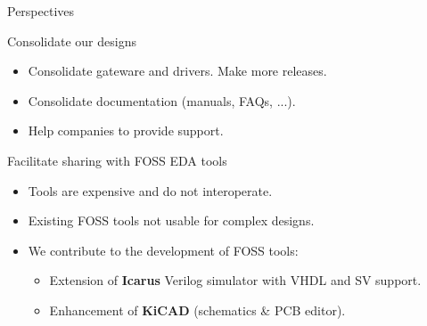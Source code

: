 \documentclass[compress,red]{beamer}
\begin{document}
\begin{frame}{Perspectives}

  \begin{block}{Consolidate our designs}
    \begin{itemize}
    \item Consolidate gateware and drivers. Make more releases.
    \item Consolidate documentation (manuals, FAQs, ...).
    \item Help companies to provide support.
    \end{itemize}
  \end{block}

  \begin{block}{Facilitate sharing with FOSS EDA tools}
    \begin{itemize}
    \item Tools are expensive and do not interoperate.
    \item Existing FOSS tools not usable for complex designs.
    \item We contribute to the development of FOSS tools:
      \begin{itemize}
      \item Extension of \textbf{Icarus} Verilog simulator with VHDL and SV support. %
      \item Enhancement of \textbf{KiCAD} (schematics \& PCB editor).
      \end{itemize}
    \end{itemize}
  \end{block}


\end{frame}
\end{document}
